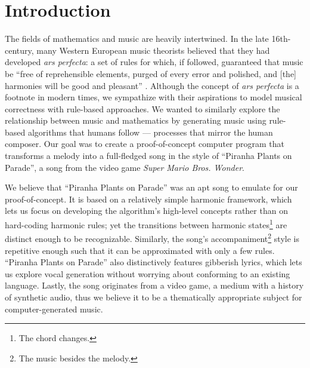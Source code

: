 \section{Introduction}

The fields of mathematics and music are heavily intertwined. In the late 16th-century, many Western European music theorists believed that they had developed \emph{ars perfecta}: a set of rules for which, if followed, guaranteed that music be ``free of reprehensible elements, purged of every error and polished, and [the] harmonies will be good and pleasant'' \autocite{Richard:2005}. Although the concept of \emph{ars perfecta} is a footnote in modern times, we sympathize with their aspirations to model musical correctness with rule-based approaches. We wanted to similarly explore the relationship between music and mathematics by generating music using rule-based algorithms that humans follow --- processes that mirror the human composer. Our goal was to create a proof-of-concept computer program that transforms a melody into a full-fledged song in the style of ``Piranha Plants on Parade'', a song from the video game \emph{Super Mario Bros. Wonder}.

We believe that ``Piranha Plants on Parade'' was an apt song to emulate for our proof-of-concept. It is based on a relatively simple harmonic framework, which lets us focus on developing the algorithm's high-level concepts rather than on hard-coding harmonic rules; yet the transitions between harmonic states\footnote{The chord changes.} are distinct enough to be recognizable. Similarly, the song's accompaniment\footnote{The music besides the melody.} style is repetitive enough such that it can be approximated with only a few rules. ``Piranha Plants on Parade'' also distinctively features gibberish lyrics, which lets us explore vocal generation without worrying about conforming to an existing language. Lastly, the song originates from a video game, a medium with a history of synthetic audio, thus we believe it to be a thematically appropriate subject for computer-generated music.

